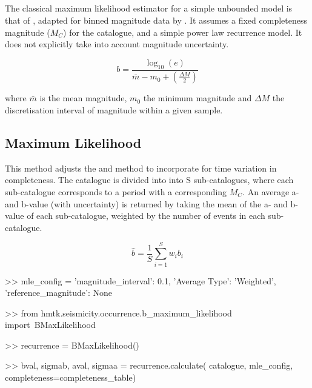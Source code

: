 \subsection{\cite{Aki1965}}

The classical maximum likelihood estimator for a simple unbounded \cite{GutenbergRichter1944} model is that of \cite{Aki1965}, adapted for binned magnitude data by \cite{Bender1983}. It assumes a fixed completeness magnitude ($M_C$) for the catalogue, and a simple power law recurrence model. It does not explicitly take into account magnitude uncertainty.

\begin{equation}
   b = \frac{ \log_{10} \left( e \right)}{ \bar{m} - m_0 + \left( {\frac{\Delta M}{2}} \right)}
\end{equation}

\noindent where $\bar{m}$ is the mean magnitude, $m_0$ the minimum magnitude and $\Delta M$ the discretisation interval of magnitude within a given sample.

\subsection{Maximum Likelihood}

This method adjusts the \cite{Aki1965} and \cite{Bender1983} method to incorporate for time variation in completeness. The catalogue is divided into
into S sub-catalogues, where each sub-catalogue corresponds to a period 
with a corresponding $M_C$.  An average a- and b-value (with uncertainty) is returned by taking 
the mean of the a- and b-value of each sub-catalogue, weighted by 
the number of events in each sub-catalogue.

\begin{equation}
   \hat{b} = \frac{1}{S} \sum_{i = 1}^{S} w_i b_i
\end{equation}

\begin{python}[frame=single]
>> mle_config = {'magnitude_interval': 0.1,
                 'Average Type': 'Weighted',
                 'reference_magnitude': None}

>> from hmtk.seismicity.occurrence.b_maximum_likelihood import\
    BMaxLikelihood

>> recurrence = BMaxLikelihood()

>> bval, sigmab, aval, sigmaa = recurrence.calculate(
    catalogue,
    mle_config, 
    completeness=completeness_table)
\end{python}

